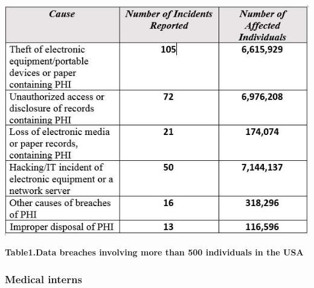 \graphicspath{ {image/} }
\begin{center}
	\includegraphics [scale=1]{Data_Breach_table_2013_2014.JPG}

\end{center}
\begin{center}
\textbf{  Table1.Data breaches involving more than 500 individuals in the USA \cite{OfficeofCivilRights2014}}
\end{center}

\subsubsection{Medical interns}

